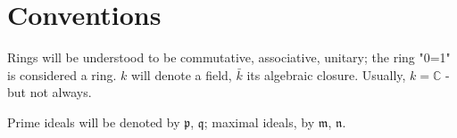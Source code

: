 \section{Conventions}


Rings will be understood to be commutative, associative, unitary; the ring "0=1" is considered a ring.
$k$ will denote a field, $\bar k$ its algebraic closure. Usually, $k = \mathbb C$ - but not always.

Prime ideals will be denoted by $\mathfrak p$, $\mathfrak q$; maximal ideals, by $\mathfrak m$, $\mathfrak n$.



